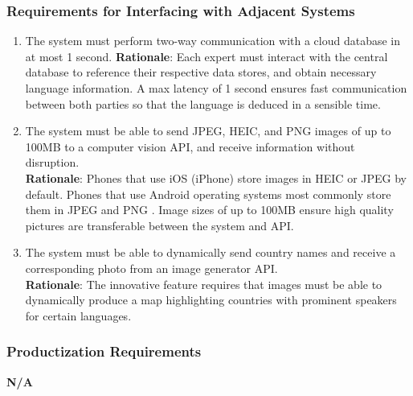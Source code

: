 \subsubsection{Requirements for Interfacing with Adjacent Systems}
\label{ssub:requirements_for_interfacing_with_adjacent_systems}
\begin{enumerate}[{OE-IA}1.]
	\item The system must perform two-way communication with a cloud database in at most 1 second.
	\textbf{Rationale}: Each expert must interact with the central database to reference their respective data stores, and obtain necessary language information. A max latency of 1 second ensures fast communication between both parties so that the language is deduced in a sensible time.   
	\item The system must be able to send JPEG, HEIC, and PNG images of up to 100MB to a computer vision API, and receive information without disruption.
	\\ \textbf{Rationale}: Phones that use iOS (iPhone) store images in HEIC or JPEG by default. Phones that use Android operating systems most commonly store them in JPEG and PNG \cite{Android2025}. Image sizes of up to 100MB ensure high quality pictures are transferable between the system and API.
	\item The system must be able to dynamically send country names and receive a corresponding photo from an image generator API.
	\\ \textbf{Rationale}: The innovative feature requires that images must be able to dynamically produce a map highlighting countries with prominent speakers for certain languages.
\end{enumerate}

\subsubsection{Productization Requirements}
\label{ssub:productization_requirements}
\textbf{N/A}

